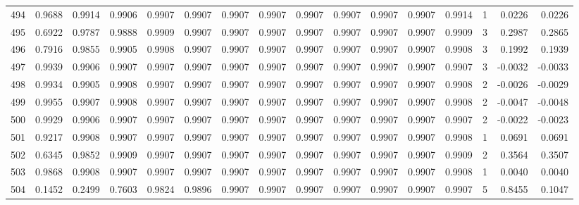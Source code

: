 \begin{tabular}{lrrrrrrrrrrrrrrr}
494 &      0.9688 &  0.9914 &  0.9906 &  0.9907 &  0.9907 &  0.9907 &  0.9907 &  0.9907 &  0.9907 &  0.9907 &   0.9907 &     0.9914 &      1 &                    0.0226 &                     0.0226 \\
495 &      0.6922 &  0.9787 &  0.9888 &  0.9909 &  0.9907 &  0.9907 &  0.9907 &  0.9907 &  0.9907 &  0.9907 &   0.9907 &     0.9909 &      3 &                    0.2987 &                     0.2865 \\
496 &      0.7916 &  0.9855 &  0.9905 &  0.9908 &  0.9907 &  0.9907 &  0.9907 &  0.9907 &  0.9907 &  0.9907 &   0.9907 &     0.9908 &      3 &                    0.1992 &                     0.1939 \\
497 &      0.9939 &  0.9906 &  0.9907 &  0.9907 &  0.9907 &  0.9907 &  0.9907 &  0.9907 &  0.9907 &  0.9907 &   0.9907 &     0.9907 &      3 &                   -0.0032 &                    -0.0033 \\
498 &      0.9934 &  0.9905 &  0.9908 &  0.9907 &  0.9907 &  0.9907 &  0.9907 &  0.9907 &  0.9907 &  0.9907 &   0.9907 &     0.9908 &      2 &                   -0.0026 &                    -0.0029 \\
499 &      0.9955 &  0.9907 &  0.9908 &  0.9907 &  0.9907 &  0.9907 &  0.9907 &  0.9907 &  0.9907 &  0.9907 &   0.9907 &     0.9908 &      2 &                   -0.0047 &                    -0.0048 \\
500 &      0.9929 &  0.9906 &  0.9907 &  0.9907 &  0.9907 &  0.9907 &  0.9907 &  0.9907 &  0.9907 &  0.9907 &   0.9907 &     0.9907 &      2 &                   -0.0022 &                    -0.0023 \\
501 &      0.9217 &  0.9908 &  0.9907 &  0.9907 &  0.9907 &  0.9907 &  0.9907 &  0.9907 &  0.9907 &  0.9907 &   0.9907 &     0.9908 &      1 &                    0.0691 &                     0.0691 \\
502 &      0.6345 &  0.9852 &  0.9909 &  0.9907 &  0.9907 &  0.9907 &  0.9907 &  0.9907 &  0.9907 &  0.9907 &   0.9907 &     0.9909 &      2 &                    0.3564 &                     0.3507 \\
503 &      0.9868 &  0.9908 &  0.9907 &  0.9907 &  0.9907 &  0.9907 &  0.9907 &  0.9907 &  0.9907 &  0.9907 &   0.9907 &     0.9908 &      1 &                    0.0040 &                     0.0040 \\
504 &      0.1452 &  0.2499 &  0.7603 &  0.9824 &  0.9896 &  0.9907 &  0.9907 &  0.9907 &  0.9907 &  0.9907 &   0.9907 &     0.9907 &      5 &                    0.8455 &                     0.1047 \\

\end{tabular}
